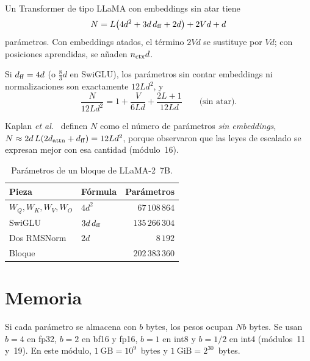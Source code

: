 \begin{teorema}\label{teo:recuento}
Un Transformer de tipo LLaMA con embeddings sin atar tiene
\[
N=L\bigl(4d^{2}+3d\,d_{\mathrm{ff}}+2d\bigr)+2Vd+d
\]
parámetros. Con embeddings atados, el término $2Vd$ se sustituye por $Vd$; con posiciones aprendidas, se añaden $n_{\mathrm{ctx}} d$.
\end{teorema}

\begin{corolario}\label{cor:kaplan}
Si $d_{\mathrm{ff}}=4d$ (o $\frac83 d$ en SwiGLU), los parámetros sin contar embeddings ni normalizaciones son exactamente $12Ld^{2}$, y
\[
\frac{N}{12Ld^{2}}=1+\frac{V}{6Ld}+\frac{2L+1}{12Ld}\qquad\text{(sin atar)}.
\]
\end{corolario}

Kaplan \emph{et al.}~\cite[§2.1, ecuación~(2.1) y tabla~1]{kaplan} definen $N$ como el número de parámetros \emph{sin embeddings}, $N\approx 2d\,L(2d_{\mathrm{attn}}+d_{\mathrm{ff}})=12Ld^{2}$, porque observaron que las leyes de escalado se expresan mejor con esa cantidad (módulo~16).

\addtocounter{definicion}{1}%

\begin{table}[ht]
\centering\small
\caption{Parámetros de un bloque de LLaMA-2~7B.}\label{tab:llama7b}
\begin{tabular}{@{}llr@{}}
\toprule
Pieza & Fórmula & Parámetros \\
\midrule
$W_Q,W_K,W_V,W_O$ & $4d^{2}$ & $67\,108\,864$ \\
SwiGLU & $3d\,d_{\mathrm{ff}}$ & $135\,266\,304$ \\
Dos RMSNorm & $2d$ & $8\,192$ \\
\midrule
Bloque & & $202\,383\,360$ \\
\bottomrule
\end{tabular}
\end{table}

\section{Memoria}

\begin{definicion}
Si cada parámetro se almacena con $b$ bytes, los pesos ocupan $Nb$ bytes. Se usan $b=4$ en fp32, $b=2$ en bf16 y fp16, $b=1$ en int8 y $b=1/2$ en int4 (módulos~11 y~19). En este módulo, $1~\mathrm{GB}=10^{9}$~bytes y $1~\mathrm{GiB}=2^{30}$~bytes.
\end{definicion}

